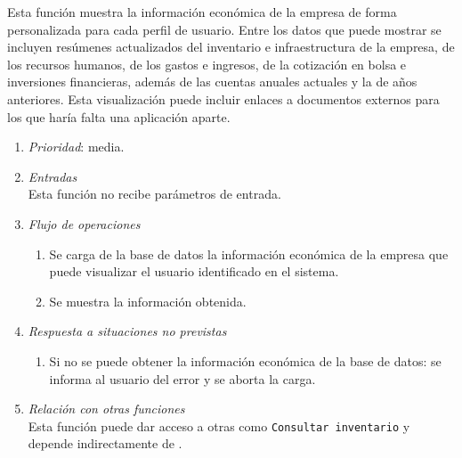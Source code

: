 
	Esta función muestra la información económica de la empresa de forma personalizada para cada perfil de usuario. Entre los datos que puede mostrar se incluyen resúmenes actualizados del inventario e infraestructura de la empresa, de los recursos humanos, de los gastos e ingresos, de la cotización en bolsa e inversiones financieras, además de las cuentas anuales actuales y la de años anteriores. Esta visualización puede incluir enlaces a documentos externos para los que haría falta una aplicación aparte.

	\begin{enumerate}
		\item \textit{Prioridad}: media.
		\item \textit{Entradas}\\
			Esta función no recibe parámetros de entrada.
			\item \textit{Flujo de operaciones}
				\begin{enumerate}
					\item Se carga de la base de datos la información económica de la empresa que puede visualizar el usuario identificado en el sistema.
					\item Se muestra la información obtenida.
			\end{enumerate}
		\item \textit{Respuesta a situaciones no previstas}
			\begin{enumerate}
				\item Si no se puede obtener la información económica de la base de datos: se informa al usuario del error y se aborta la carga.
			\end{enumerate}
		\item \textit{Relación con otras funciones}\\
			Esta función puede dar acceso a otras como \verb|Consultar inventario| y depende indirectamente de .
	\end{enumerate}
